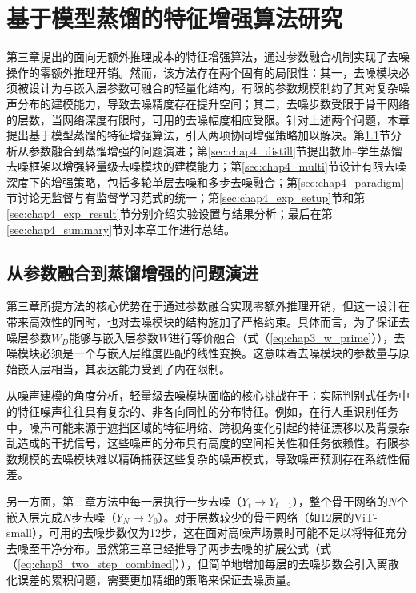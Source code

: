 ﻿\setlength{\baselineskip}{20pt}
\chapter{基于模型蒸馏的特征增强算法研究}
\label{cha:chap4}

第三章提出的面向无额外推理成本的特征增强算法，通过参数融合机制实现了去噪操作的零额外推理开销。然而，该方法存在两个固有的局限性：其一，去噪模块必须被设计为与嵌入层参数可融合的轻量化结构，有限的参数规模制约了其对复杂噪声分布的建模能力，导致去噪精度存在提升空间；其二，去噪步数受限于骨干网络的层数，当网络深度有限时，可用的去噪幅度相应受限。针对上述两个问题，本章提出基于模型蒸馏的特征增强算法，引入两项协同增强策略加以解决。第\ref{sec:chap4_evolution}节分析从参数融合到蒸馏增强的问题演进；第\ref{sec:chap4_distill}节提出教师--学生蒸馏去噪框架以增强轻量级去噪模块的建模能力；第\ref{sec:chap4_multi}节设计有限去噪深度下的增强策略，包括多轮单层去噪和多步去噪融合；第\ref{sec:chap4_paradigm}节讨论无监督与有监督学习范式的统一；第\ref{sec:chap4_exp_setup}节和第\ref{sec:chap4_exp_result}节分别介绍实验设置与结果分析；最后在第\ref{sec:chap4_summary}节对本章工作进行总结。

\section{从参数融合到蒸馏增强的问题演进}
\label{sec:chap4_evolution}

第三章所提方法的核心优势在于通过参数融合实现零额外推理开销，但这一设计在带来高效性的同时，也对去噪模块的结构施加了严格约束。具体而言，为了保证去噪层参数$W_D$能够与嵌入层参数$W$进行等价融合（式（\ref{eq:chap3_w_prime}）），去噪模块必须是一个与嵌入层维度匹配的线性变换。这意味着去噪模块的参数量与原始嵌入层相当，其表达能力受到了内在限制。

从噪声建模的角度分析，轻量级去噪模块面临的核心挑战在于：实际判别式任务中的特征噪声往往具有复杂的、非各向同性的分布特征。例如，在行人重识别任务中，噪声可能来源于遮挡区域的特征坍缩、跨视角变化引起的特征漂移以及背景杂乱造成的干扰信号，这些噪声的分布具有高度的空间相关性和任务依赖性。有限参数规模的去噪模块难以精确捕获这些复杂的噪声模式，导致噪声预测存在系统性偏差。

另一方面，第三章方法中每一层执行一步去噪（$Y_t \rightarrow Y_{t-1}$），整个骨干网络的$N$个嵌入层完成$N$步去噪（$Y_N \rightarrow Y_0$）。对于层数较少的骨干网络（如12层的ViT-small），可用的去噪步数仅为12步，这在面对高噪声场景时可能不足以将特征充分去噪至干净分布。虽然第三章已经推导了两步去噪的扩展公式（式（\ref{eq:chap3_two_step_combined}）），但简单地增加每层的去噪步数会引入离散化误差的累积问题，需要更加精细的策略来保证去噪质量。

